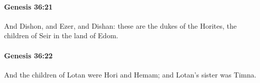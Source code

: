 		\paragraph{Genesis 36:21} %
			\label{GENESIS-36-21}

			And Dishon, and Ezer, and Dishan: these are the dukes of the Horites, the children of Seir in the land of Edom.


		\paragraph{Genesis 36:22} %
			\label{GENESIS-36-22}

			And the children of Lotan were Hori and Hemam; and Lotan's sister was Timna.


